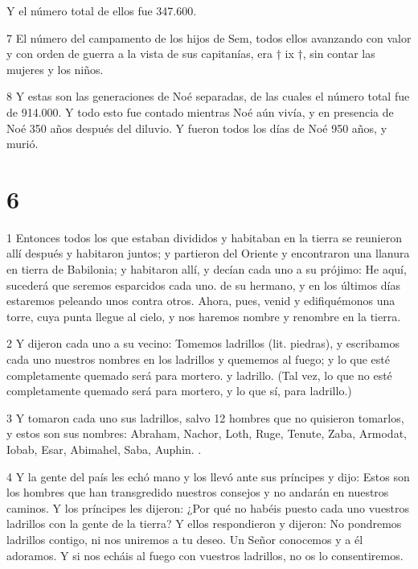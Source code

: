 \par Y el número total de ellos fue 347.600.

\par 7 El número del campamento de los hijos de Sem, todos ellos avanzando con valor y con orden de guerra a la vista de sus capitanías, era † ix †, sin contar las mujeres y los niños.

\par 8 Y estas son las generaciones de Noé separadas, de las cuales el número total fue de 914.000. Y todo esto fue contado mientras Noé aún vivía, y en presencia de Noé 350 años después del diluvio. Y fueron todos los días de Noé 950 años, y murió.

\chapter{6}

\par 1 Entonces todos los que estaban divididos y habitaban en la tierra se reunieron allí después y habitaron juntos; y partieron del Oriente y encontraron una llanura en tierra de Babilonia; y habitaron allí, y decían cada uno a su prójimo: He aquí, sucederá que seremos esparcidos cada uno. de su hermano, y en los últimos días estaremos peleando unos contra otros. Ahora, pues, venid y edifiquémonos una torre, cuya punta llegue al cielo, y nos haremos nombre y renombre en la tierra.

\par 2 Y dijeron cada uno a su vecino: Tomemos ladrillos (lit. piedras), y escribamos cada uno nuestros nombres en los ladrillos y quememos al fuego; y lo que esté completamente quemado será para mortero. y ladrillo. (Tal vez, lo que no esté completamente quemado será para mortero, y lo que sí, para ladrillo.)

\par 3 Y tomaron cada uno sus ladrillos, salvo 12 hombres que no quisieron tomarlos, y estos son sus nombres: Abraham, Nachor, Loth, Ruge, Tenute, Zaba, Armodat, Iobab, Esar, Abimahel, Saba, Auphin. .

\par 4 Y la gente del país les echó mano y los llevó ante sus príncipes y dijo: Estos son los hombres que han transgredido nuestros consejos y no andarán en nuestros caminos. Y los príncipes les dijeron: ¿Por qué no habéis puesto cada uno vuestros ladrillos con la gente de la tierra? Y ellos respondieron y dijeron: No pondremos ladrillos contigo, ni nos uniremos a tu deseo. Un Señor conocemos y a él adoramos. Y si nos echáis al fuego con vuestros ladrillos, no os lo consentiremos.

